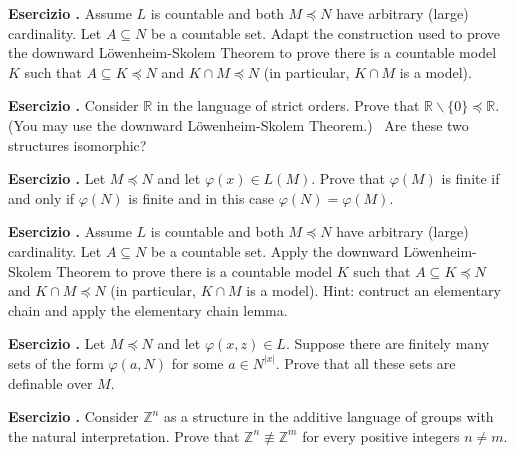 \documentclass[10pt]{article}
\def\phi{\varphi}
\def\sm{\smallsetminus}
\def\ZZ{\mathds Z}
\def\RR{\mathds R}
\newcounter{ex}
\newenvironment{exercise}{\bigskip\addtocounter{ex}{1}\textbf{Esercizio \theex.\quad}}{}
\begin{document}
\clearpage%
\setcounter{ex}{0}



\begin{exercise}
Assume $L$ is countable and both $M\preceq N$ have arbitrary (large) cardinality. Let $A\subseteq N$ be a countable set. Adapt the construction used to prove the downward L\"owenheim-Skolem Theorem to prove there is a countable model $K$ such that $A\subseteq K\preceq N$ and $K\cap M\preceq N$ (in particular, $K\cap M$ is a model).  
\end{exercise}


\begin{exercise}
Consider $\RR$ in the language of strict orders. Prove that $\RR\sm\{0\}\preceq \RR$. (You may use the downward L\"owenheim-Skolem Theorem.) \ Are these two structures isomorphic?
\end{exercise}


\begin{exercise}
Let $M\preceq N$ and let $\phi(x)\in L(M)$.
Prove that $\phi(M)$ is finite if and only if $\phi(N)$ is finite and in this case $\phi(N)=\phi(M)$.
\end{exercise}

\clearpage%
\setcounter{ex}{0}


\begin{exercise}
  Assume $L$ is countable and both $M\preceq N$ have arbitrary (large) cardinality. Let $A\subseteq N$ be a countable set. Apply the downward L\"owenheim-Skolem Theorem to prove there is a countable model $K$ such that $A\subseteq K\preceq N$ and $K\cap M\preceq N$ (in particular, $K\cap M$ is a model). Hint: contruct an elementary chain and apply the elementary chain lemma.
\end{exercise}

\begin{exercise}
  Let $M\preceq N$ and let $\phi(x,z)\in L$.
  Suppose there are finitely many sets of the form $\phi(a,N)$ for some $a\in N^{|x|}$.
  Prove that all these sets are definable over $M$.
\end{exercise}

\begin{exercise}
  Consider $\ZZ^n$ as a structure in the additive language of groups with the natural interpretation.
  Prove that $\ZZ^n\not\equiv\ZZ^m$ for every positive integers $n\neq m$.
\end{exercise}
\end{document}
